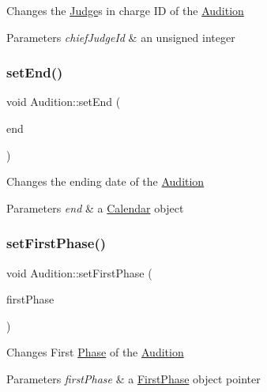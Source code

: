 Changes the \hyperlink{class_judge}{Judge}\textquotesingle{}s in charge ID of the \hyperlink{class_audition}{Audition} 
\begin{DoxyParams}{Parameters}
{\em chief\+Judge\+Id} & an unsigned integer \\
\hline
\end{DoxyParams}
\mbox{\label{class_audition_add002a59ed08c058cee6635fa910380f}} 
\subsubsection{\texorpdfstring{set\+End()}{setEnd()}}
{\footnotesize\ttfamily void Audition\+::set\+End (\begin{DoxyParamCaption}\item[{\hyperlink{class_calendar}{Calendar}}]{end }\end{DoxyParamCaption})}

Changes the ending date of the \hyperlink{class_audition}{Audition} 
\begin{DoxyParams}{Parameters}
{\em end} & a \hyperlink{class_calendar}{Calendar} object \\
\hline
\end{DoxyParams}
\mbox{\label{class_audition_a49ba58d1a2dd0322b84052633951285b}} 
\subsubsection{\texorpdfstring{set\+First\+Phase()}{setFirstPhase()}}
{\footnotesize\ttfamily void Audition\+::set\+First\+Phase (\begin{DoxyParamCaption}\item[{\hyperlink{class_first_phase}{First\+Phase} $\ast$}]{first\+Phase }\end{DoxyParamCaption})}

Changes First \hyperlink{class_phase}{Phase} of the \hyperlink{class_audition}{Audition} 
\begin{DoxyParams}{Parameters}
{\em first\+Phase} & a \hyperlink{class_first_phase}{First\+Phase} object pointer \\
\hline
\end{DoxyParams}
\mbox{\label{class_audition_a2d0d263754db4ca7c99b4019a61dc6c2}} 
